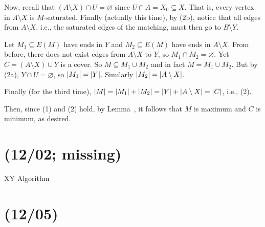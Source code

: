 \begin{prf}
  Now, recall that $(A \setminus X) \cap U = \varnothing$
  since $U \cap A = X_0 \subseteq X$.
  That is, every vertex in $A \setminus X$ is $M$-saturated.
  Finally (actually this time), by (2b),
  notice that all edges from $A \setminus X$, i.e.,
  the saturated edges of the matching, must then go to $B \setminus Y$.

  Let $M_1 \subseteq E(M)$ have ends in $Y$ and $M_2 \subseteq E(M)$ have ends in $A \setminus X$.
  From before, there does not exist edges from $A \setminus X$ to $Y$,
  so $M_1 \cap M_2 = \varnothing$.
  Yet $C = (A \setminus X) \cup Y$ is a cover.
  So $M \subseteq M_1 \cup M_2$ and in fact $M = M_1 \cup M_2$.
  But by (2a), $Y \cap U = \varnothing$, so $\abs{M_1} = \abs{Y}$.
  Similarly $\abs{M_2} = \abs{A \setminus X}$.
  
  Finally (for the third time), $\abs{M} = \abs{M_1} + \abs{M_2}
    = \abs{Y} + \abs{A \setminus X} = \abs{C}$, i.e., (2).

  Then, since (1) and (2) hold, by Lemma~,
  it follows that $M$ is maximum and $C$ is minimum, as desired.
\end{prf}

\section{(12/02; missing)}

XY Algorithm

\section{(12/05)}

